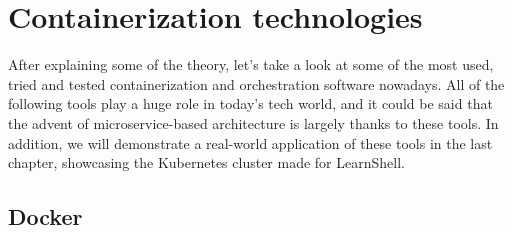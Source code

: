 \documentclass[thesis=B,english]{FITthesis}[2019/12/23]
\begin{document}
\section{Containerization technologies}

After explaining some of the theory, let's take a look at some of the most used, tried and tested containerization and orchestration software nowadays. All of the following tools play a huge role in today's tech world, and it could be said that the advent of microservice-based architecture is largely thanks to these tools. In addition, we will demonstrate a real-world application of these tools in the last chapter, showcasing the Kubernetes cluster made for LearnShell.

\subsection{Docker}
\end{document}
